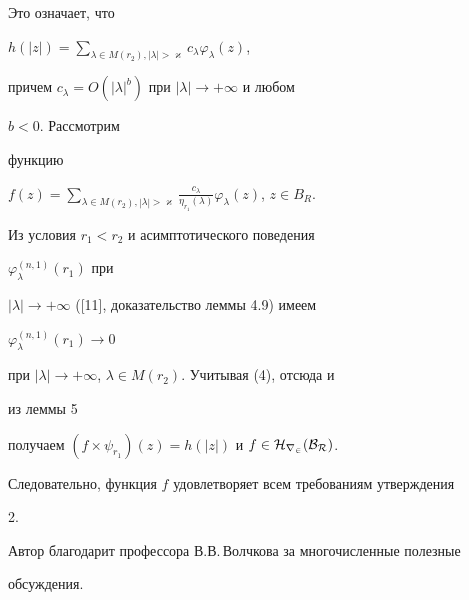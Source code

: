 Это означает, что 


$h(|z|)=\sum\limits_{\lambda\in M(r_2),|\lambda|>\varkappa} 


c_\lambda\varphi_\lambda(z)$, 


причем $c_\lambda=O(|\lambda|^b)$ при $|\lambda|\to+\infty$ и любом 


$b<0$. Рассмотрим 


функцию 


$f(z)=\sum\limits_{\lambda\in M(r_2),|\lambda|>\varkappa} 


\frac{c_\lambda}{\eta_{r_1}(\lambda)}\varphi_\lambda(z)$, $z\in B_R$. 


Из условия $r_1<r_2$ и асимптотического поведения 


$\varphi^{(n,1)}_\lambda(r_1)$ при 


$|\lambda|\to+\infty$ ([11], доказательство леммы 4.9) имеем 


$\varphi^{(n,1)}_\lambda(r_1)\to0$ 


при $|\lambda|\to+\infty$, $\lambda\in M(r_2)$. Учитывая (4), отсюда и 


из леммы 5 


получаем $(f\times\psi_{r_1})(z)=h(|z|)$ и $f\in\cal H_{r_2}(B_R)$. 


Следовательно, функция $f$ удовлетворяет всем требованиям утверждения 


2. 


 


Автор благодарит профессора В.В.\,Волчкова за многочисленные полезные 


обсуждения. 


 


